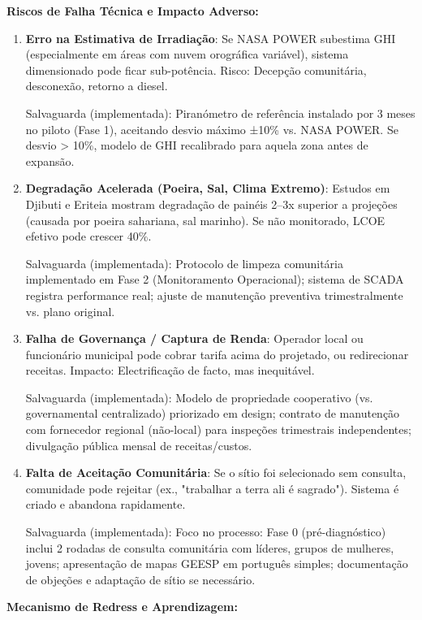 \documentclass[12pt, a4paper]{article}
\begin{document}
{{{{{{{{{{{{\textbf{Riscos de Falha Técnica e Impacto Adverso:}

\begin{enumerate}
\item \textbf{Erro na Estimativa de Irradiação}: Se NASA POWER subestima GHI (especialmente em áreas com nuvem orográfica variável), sistema dimensionado pode ficar sub-potência. Risco: Decepção comunitária, desconexão, retorno a diesel.
  
  Salvaguarda (implementada): Piranómetro de referência instalado por 3 meses no piloto (Fase 1), aceitando desvio máximo ±10\% vs. NASA POWER. Se desvio > 10\%, modelo de GHI recalibrado para aquela zona antes de expansão.

\item \textbf{Degradação Acelerada (Poeira, Sal, Clima Extremo)}: Estudos em Djibuti e Eriteia mostram degradação de painéis 2--3x superior a projeções (causada por poeira sahariana, sal marinho). Se não monitorado, LCOE efetivo pode crescer 40\%.
  
  Salvaguarda (implementada): Protocolo de limpeza comunitária implementado em Fase 2 (Monitoramento Operacional); sistema de SCADA registra performance real; ajuste de manutenção preventiva trimestralmente vs. plano original.

\item \textbf{Falha de Governança / Captura de Renda}: Operador local ou funcionário municipal pode cobrar tarifa acima do projetado, ou redirecionar receitas. Impacto: Electrificação de facto, mas inequitável.
  
  Salvaguarda (implementada): Modelo de propriedade cooperativo (vs. governamental centralizado) priorizado em design; contrato de manutenção com fornecedor regional (não-local) para inspeções trimestrais independentes; divulgação pública mensal de receitas/custos.

\item \textbf{Falta de Aceitação Comunitária}: Se o sítio foi selecionado sem consulta, comunidade pode rejeitar (ex., "trabalhar a terra ali é sagrado"). Sistema é criado e abandona rapidamente.
  
  Salvaguarda (implementada): Foco no processo: Fase 0 (pré-diagnóstico) inclui 2 rodadas de consulta comunitária com líderes, grupos de mulheres, jovens; apresentação de mapas GEESP em português simples; documentação de objeções e adaptação de sítio se necessário.
\end{enumerate}

\textbf{Mecanismo de Redress e Aprendizagem:}

}}}}}}}}}}}}
\end{document}
